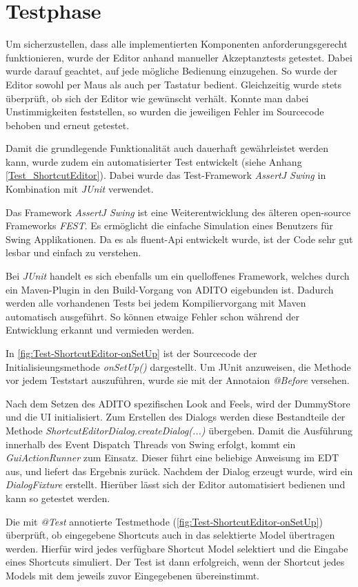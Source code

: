 \section{Testphase}

Um sicherzustellen, dass alle implementierten Komponenten anforderungsgerecht funktionieren, wurde der Editor anhand manueller Akzeptanztests getestet. Dabei wurde darauf geachtet, auf jede mögliche Bedienung einzugehen. So wurde der Editor sowohl per Maus als auch per Tastatur bedient. Gleichzeitig wurde stets überprüft, ob sich der Editor wie gewünscht verhält. Konnte man dabei Unstimmigkeiten feststellen, so wurden die jeweiligen Fehler im Sourcecode behoben und erneut getestet.

Damit die grundlegende Funktionalität auch dauerhaft gewährleistet werden kann, wurde zudem ein automatisierter Test entwickelt (siehe Anhang \ref{Test_ShortcutEditor}). Dabei wurde das Test-Framework \emph{AssertJ Swing} in Kombination mit \emph{JUnit} verwendet.

Das Framework \emph{AssertJ Swing} ist eine Weiterentwicklung des älteren open-source Frameworks \emph{FEST}. Es ermöglicht die einfache Simulation eines Benutzers für Swing Applikationen. Da es als fluent-Api entwickelt wurde, ist der Code sehr gut lesbar und einfach zu verstehen.

Bei \emph{JUnit} handelt es sich ebenfalls um ein quelloffenes Framework, welches durch ein Maven-Plugin in den Build-Vorgang von ADITO eigebunden ist. Dadurch werden alle vorhandenen Tests bei jedem Kompiliervorgang mit Maven automatisch ausgeführt. So können etwaige Fehler schon während der Entwicklung erkannt und vermieden werden.



In \autoref{fig:Test-ShortcutEditor-onSetUp} ist der Sourcecode der Initialisieungsmethode \emph{onSetUp()} dargestellt. Um JUnit anzuweisen, die Methode vor jedem Teststart auszuführen, wurde sie mit der Annotaion \emph{@Before} versehen. 

\vspace{10px}

Nach dem Setzen des ADITO spezifischen Look and Feels, wird der DummyStore und die UI initialisiert. Zum Erstellen des Dialogs werden diese Bestandteile der Methode \emph{ShortcutEditorDialog.createDialog(...)} übergeben. Damit die Ausführung innerhalb des Event Dispatch Threads von Swing erfolgt, kommt ein \emph{GuiActionRunner} zum Einsatz. Dieser führt eine beliebige Anweisung im EDT aus, und liefert das Ergebnis zurück. Nachdem der Dialog erzeugt wurde, wird ein \emph{DialogFixture} erstellt. Hierüber lässt sich der Editor automatisiert bedienen und kann so getestet werden.



Die mit \emph{@Test} annotierte Testmethode (\autoref{fig:Test-ShortcutEditor-onSetUp}) überprüft, ob eingegebene Shortcuts auch in das selektierte Model übertragen werden. Hierfür wird jedes verfügbare Shortcut Model selektiert und die Eingabe eines Shortcuts simuliert. Der Test ist dann erfolgreich, wenn der Shortcut jedes Models mit dem jeweils zuvor Eingegebenen übereinstimmt.
\newpage